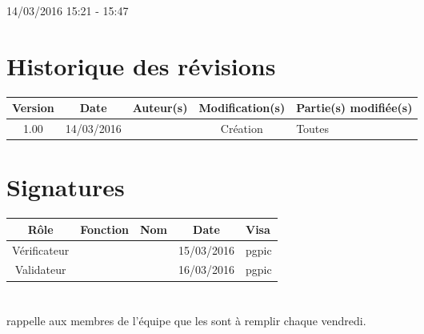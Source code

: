 \documentclass [a4paper] {article}
\begin{document}
14/03/2016			 				%
\hfill   
\hfill 	 15:21 - 15:47 				%



\section*{Historique des révisions}
\begin{center}
			\begin{tabular}{| c | c | c | c | p{4cm} |}
				\hline
				\rowcolor{Gray}
				Version & Date & Auteur(s) & Modification(s) & Partie(s) modifiée(s)		 \\
				\hline
				1.00 & 14/03/2016 & \Pierre & Création & Toutes \\
		\hline		
			\end{tabular}
		\end{center}

\section*{Signatures}

		\begin{center}
			\begin{tabular}{| c | c | c | c | p{4cm} |}
				\hline
				\rowcolor{Gray}
				Rôle & Fonction & Nom & Date & Visa		 \\
				\hline
				Vérificateur & \RQA & \Kafui & 15/03/2016 & pgpic \\[30pt]
				\hline
				Validateur & \CP & \Sergi & 16/03/2016 & pgpic \\[30pt]	
				\hline
			\end{tabular}
		\end{center}
		
\newpage		



\section{\FS}
\Sergi{} rappelle aux membres de l'équipe que les \FS{} sont à remplir chaque vendredi.
\end{document}
